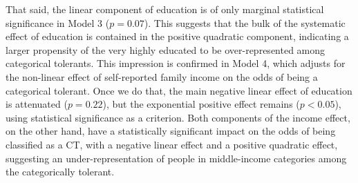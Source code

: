 \documentclass[12pt]{article}
\begin{document}
That said, the linear component of education is of only marginal statistical significance in Model 3 ($p = 0.07$). This suggests that the bulk of the systematic effect of education is contained in the positive quadratic component, indicating a larger propensity of the very highly educated to be over-represented among categorical tolerants. This impression is confirmed in Model 4, which adjusts for the non-linear effect of self-reported family income on the odds of being a categorical tolerant. Once we do that, the main negative linear effect of education is attenuated ($p = 0.22$), but the exponential positive effect remains ($p < 0.05$), using statistical significance as a criterion. Both components of the income effect, on the other hand, have a statistically significant impact on the odds of being classified as a CT, with a negative linear effect and a positive quadratic effect, suggesting an under-representation of people in middle-income categories among the categorically tolerant. 
\end{document}
